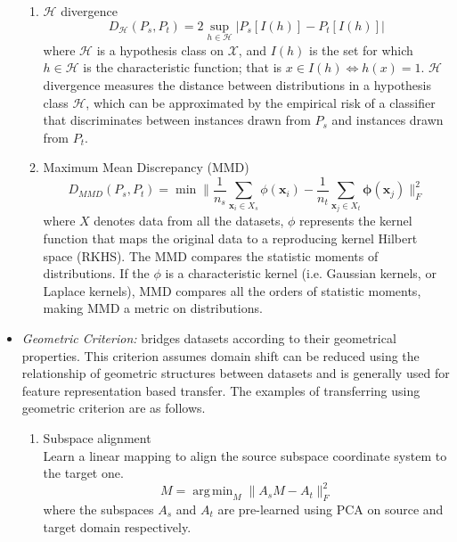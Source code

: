 \documentclass[prodmode]{acmsmall}  %
\DeclareMathOperator*{\argmin}{arg\,min}
\begin{document}
\begin{itemize}
\begin{enumerate}
\item $\mathcal{H}$ divergence~\cite{Ben-David2007,Ben-David2010}\\
\begin{equation}
D_{\mathcal{H}}(P_s, P_t) = 2\sup_{h\in{\mathcal{H}}}|P_s[I(h)]-P_t[I(h)]|
\end{equation}
where $\mathcal{H}$ is a hypothesis class on $\mathcal{X}$, and $I(h)$ 
is the set for which $h\in \mathcal{H}$ is the characteristic function; that is $x\in I(h)\Leftrightarrow h(x)=1$. 
$\mathcal{H}$ divergence measures the distance between distributions in a hypothesis class $\mathcal{H}$, which can be approximated by the empirical risk of a classifier that discriminates between instances drawn from $P_s$ and instances drawn from $P_t$.
\item Maximum Mean Discrepancy (MMD)~\cite{Pan2009}\\
\begin{equation}
D_{MMD}(P_s, P_t) = \min \|\frac{1}{n_s}\sum_{\mathbf{x}_i\in{X_s}}\phi(\mathbf{x}_i)-\frac{1}{n_t}\sum_{\mathbf{x}_j\in{X_t}}\mathbf\phi(\mathbf{x}_j)\|^2_F 
\end{equation}
where $X$ denotes data from all the datasets, $\phi$ represents the kernel function that maps the original data to a reproducing kernel Hilbert space (RKHS). The MMD compares the statistic moments of distributions. If the $\phi$ is a characteristic kernel (i.e. Gaussian kernels, or Laplace kernels), MMD compares all the orders of statistic moments, making MMD a metric on distributions.
\end{enumerate}
\item \textit{Geometric Criterion:} bridges datasets according to their geometrical properties. %
This criterion assumes domain shift can be reduced using the relationship of geometric structures between datasets and is generally used for feature representation based transfer. The examples of transferring using geometric criterion are as follows.
\begin{enumerate}
\item Subspace alignment~\cite{Fernando2013}\\
Learn a linear mapping to align the source subspace coordinate system to the target one.
\begin{equation}
M = \argmin_M\|A_sM-A_t\|_F^2
\end{equation}
where the subspaces $A_s$ and $A_t$ are pre-learned using PCA on source and target domain respectively.

\end{enumerate}
\end{itemize}
\end{document}

